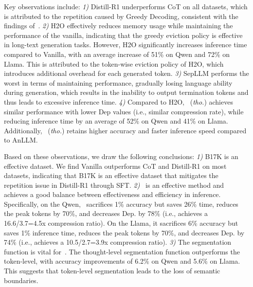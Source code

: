 Key observations include:
\textit{1)} Distill-R1 underperforms CoT on all datasets, which is attributed to the repetition caused by Greedy Decoding, consistent with the findings of~\citeauthor{arxiv25_deepseek_r1}.
\textit{2)} H2O effectively reduces memory usage while maintaining the performance of the vanilla, indicating that the greedy eviction policy is effective in long-text generation tasks. 
However, H2O significantly increases inference time compared to Vanilla, with an average increase of 51\% on Qwen and 72\% on Llama. 
This is attributed to the token-wise eviction policy of H2O, which introduces additional overhead for each generated token.
\textit{3)} SepLLM performs the worst in terms of maintaining performance, gradually losing language ability during generation, which results in the inability to output termination tokens and thus leads to excessive inference time.
\textit{4)} Compared to H2O, \ours~(\textit{tho.}) achieves similar performance with lower Dep values (i.e., similar compression rate), while reducing inference time by an average of 52\% on Qwen and 41\% on Llama. 
Additionally, \ours~(\textit{tho.}) retains higher accuracy and faster inference speed compared to AnLLM.

{Based on these observations, we draw the following conclusions}:
\textit{1)} {B17K is an effective dataset.}
We find Vanilla outperforms CoT and Distill-R1 on most datasets, indicating that B17K is an effective dataset that mitigates the repetition issue in Distill-R1 through SFT.
\textit{2)} {\ours~is an effective method and achieves a good balance between effectiveness and efficiency in inference.}
Specifically, on the Qwen, \ours~sacrifices 1\% accuracy but saves 26\% time, reduces the peak tokens by 70\%, and decreases Dep. by 78\% (i.e., achieves a 16.6/3.7=4.5x compression ratio). 
On the Llama, it sacrifices 6\% accuracy but saves 1\% inference time, reduces the peak tokens by 70\%, and decreases Dep. by 74\% (i.e., achieves a 10.5/2.7=3.9x compression ratio).
\textit{3)} {The segmentation function is vital for~\ours.} %
The thought-level segmentation function outperforms the token-level, with accuracy improvements of 6.2\% on Qwen and 5.6\% on Llama. 
This suggests that token-level segmentation leads to the loss of semantic boundaries.


